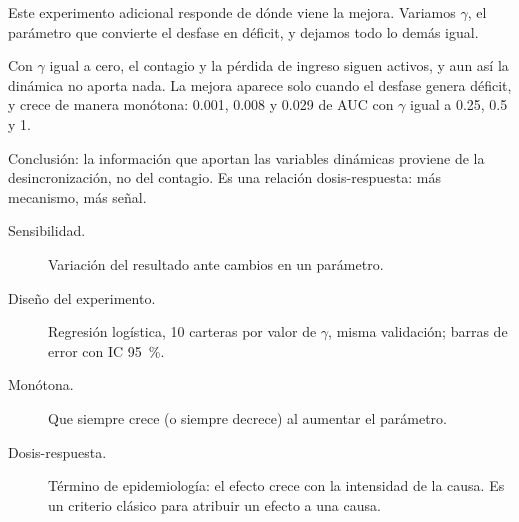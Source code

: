 \begin{decir}
Este experimento adicional responde de dónde viene la mejora. Variamos $\gamma$, el
parámetro que convierte el desfase en déficit, y dejamos todo lo demás igual.

Con $\gamma$ igual a cero, el contagio y la pérdida de ingreso siguen activos, y aun así la
dinámica no aporta nada. La mejora aparece solo cuando el desfase genera déficit, y crece
de manera monótona: 0.001, 0.008 y 0.029 de AUC con $\gamma$ igual a 0.25, 0.5 y 1.

Conclusión: la información que aportan las variables dinámicas proviene de la
desincronización, no del contagio. Es una relación dosis-respuesta: más mecanismo, más
señal.
\end{decir}
\begin{terminos}
\begin{description}
\item[Sensibilidad.] Variación del resultado ante cambios en un parámetro.
\item[Diseño del experimento.] Regresión logística, 10 carteras por valor de $\gamma$,
misma validación; barras de error con IC 95~\%.
\item[Monótona.] Que siempre crece (o siempre decrece) al aumentar el parámetro.
\item[Dosis-respuesta.] Término de epidemiología: el efecto crece con la intensidad de la
causa. Es un criterio clásico para atribuir un efecto a una causa.
\end{description}
\end{terminos}

